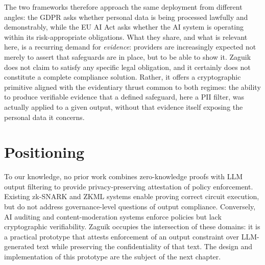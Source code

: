 \medskip

The two frameworks therefore approach the same deployment from different angles: the GDPR asks whether personal data is being processed lawfully and demonstrably, while the EU AI Act asks whether the AI system is operating within its risk-appropriate obligations. What they share, and what is relevant here, is a recurring demand for \emph{evidence}: providers are increasingly expected not merely to assert that safeguards are in place, but to be able to show it. Zaguik does not claim to satisfy any specific legal obligation, and it certainly does not constitute a complete compliance solution. Rather, it offers a cryptographic primitive aligned with the evidentiary thrust common to both regimes: the ability to produce verifiable evidence that a defined safeguard, here a PII filter, was actually applied to a given output, without that evidence itself exposing the personal data it concerns.

\section{Positioning}
\label{sec:rw-positioning}

To our knowledge, no prior work combines zero-knowledge proofs with LLM output filtering to provide privacy-preserving attestation of policy enforcement. Existing zk-SNARK and ZKML systems enable proving correct circuit execution, but do not address governance-level questions of output compliance. Conversely, AI auditing and content-moderation systems enforce policies but lack cryptographic verifiability. Zaguik occupies the intersection of these domains: it is a practical prototype that attests enforcement of an output constraint over LLM-generated text while preserving the confidentiality of that text. The design and implementation of this prototype are the subject of the next chapter.
